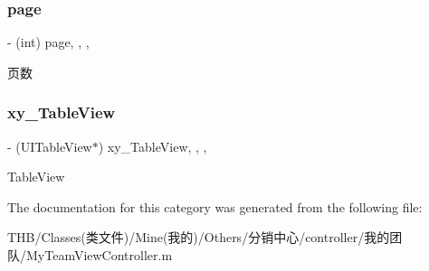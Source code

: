 \subsubsection{\texorpdfstring{page}{page}}
{\footnotesize\ttfamily -\/ (int) page\hspace{0.3cm}{\ttfamily [read]}, {\ttfamily [write]}, {\ttfamily [nonatomic]}, {\ttfamily [assign]}}

页数 \mbox{\label{category_my_team_view_controller_07_08_a9b856613b7990faf45e9108c1ba1951f}} 
\subsubsection{\texorpdfstring{xy\+\_\+\+Table\+View}{xy\_TableView}}
{\footnotesize\ttfamily -\/ (U\+I\+Table\+View$\ast$) xy\+\_\+\+Table\+View\hspace{0.3cm}{\ttfamily [read]}, {\ttfamily [write]}, {\ttfamily [nonatomic]}, {\ttfamily [strong]}}

Table\+View 

The documentation for this category was generated from the following file\+:\begin{DoxyCompactItemize}
\item 
T\+H\+B/\+Classes(类文件)/\+Mine(我的)/\+Others/分销中心/controller/我的团队/My\+Team\+View\+Controller.\+m\end{DoxyCompactItemize}
